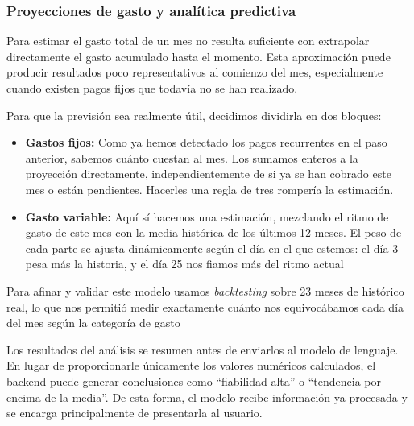 \subsubsection{Proyecciones de gasto y analítica predictiva}

Para estimar el gasto total de un mes no resulta suficiente con extrapolar
directamente el gasto acumulado hasta el momento. Esta aproximación puede
producir resultados poco representativos al comienzo del mes, especialmente
cuando existen pagos fijos que todavía no se han realizado.

Para que la previsión sea realmente útil, decidimos dividirla en dos bloques:

\begin{itemize}

    \item \textbf{Gastos fijos:} Como ya hemos detectado los pagos recurrentes en el paso anterior, 
    sabemos cuánto cuestan al mes. Los sumamos enteros a la proyección directamente, independientemente 
    de si ya se han cobrado este mes o están pendientes. Hacerles una regla de tres rompería la estimación.

    \item \textbf{Gasto variable:} Aquí sí hacemos una estimación, mezclando el ritmo de gasto de este mes con la 
media histórica de los últimos 12 meses. El peso de cada parte se ajusta dinámicamente según el día en el que estemos: 
el día 3 pesa más la historia, y el día 25 nos fiamos más del ritmo actual

\end{itemize}

Para afinar y validar este modelo usamos \textit{backtesting} sobre 23 meses de histórico real, lo que nos permitió 
medir exactamente cuánto nos equivocábamos cada día del mes según la categoría de gasto

Los resultados del análisis se resumen antes de enviarlos al modelo de
lenguaje. En lugar de proporcionarle únicamente los valores numéricos
calculados, el backend puede generar conclusiones como ``fiabilidad alta'' o
``tendencia por encima de la media''. De esta forma, el modelo recibe
información ya procesada y se encarga principalmente de presentarla al usuario.